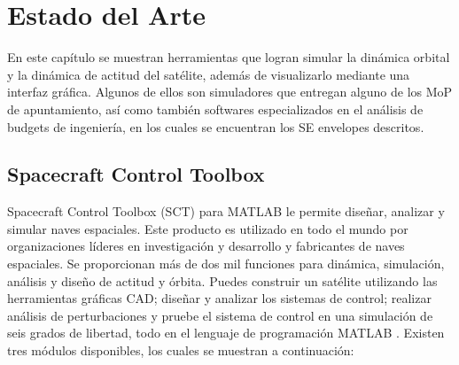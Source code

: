 \section{Estado del Arte}

En este capítulo se muestran herramientas que logran simular la dinámica orbital y la dinámica de actitud del satélite, además de visualizarlo mediante una interfaz gráfica. Algunos de ellos son simuladores que entregan alguno de los MoP de apuntamiento, así como también softwares especializados en el análisis de budgets de ingeniería, en los cuales se encuentran los SE envelopes descritos.

\subsection{Spacecraft Control Toolbox}

Spacecraft Control Toolbox (SCT) para MATLAB le permite diseñar, analizar y simular naves espaciales. Este producto es utilizado en todo el mundo por organizaciones líderes en investigación y desarrollo y fabricantes de naves espaciales. Se proporcionan más de dos mil funciones para dinámica, simulación, análisis y diseño de actitud y órbita. Puedes construir un satélite utilizando las herramientas gráficas CAD; diseñar y analizar los sistemas de control; realizar análisis de perturbaciones y pruebe el sistema de control en una simulación de seis grados de libertad, todo en el lenguaje de programación MATLAB \cite{ref18}. Existen tres módulos disponibles, los cuales se muestran a continuación:

